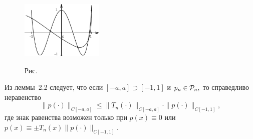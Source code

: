  \bigskip
\begin{figure}[ht]
\begin{center}
\includegraphics[width=0.35\textwidth]{pict02-4.eps}
\end{center}
 \bigskip
 \label{r2-4}

 \centerline{Рис.~\theris}
 \bigskip
\end{figure}




\begin{Remark}
Из леммы~2.2 следует, что если $[-a,a] \supset [-1,1]$
 и $p_n \in \mathcal{P}_n,$ то справедливо неравенство
\[
  \|p(\cdot )\|_{C[-a,a]} \le \|T_n(\cdot )\|_{C[-a,a]}\cdot \|p(\cdot )\|_{C[-1,1]},
\]
{где знак равенства возможен только при $p(x)\equiv 0$ или $p(x)\equiv\pm T_n(x)
\|p(\cdot )\|_{C[-1,1]}$.}
\end{Remark}
